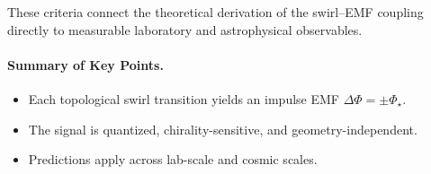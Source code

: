 \documentclass[11pt]{article}
\begin{document}
        These criteria connect the theoretical derivation of the swirl–EMF coupling directly to measurable
        laboratory and astrophysical observables.

        \paragraph*{Summary of Key Points.}
        \begin{itemize}
          \item Each topological swirl transition yields an impulse EMF \( \Delta \Phi = \pm \Phi_\star \).
          \item The signal is quantized, chirality-sensitive, and geometry-independent.
          \item Predictions apply across lab-scale and cosmic scales.
        \end{itemize}




\end{document}
